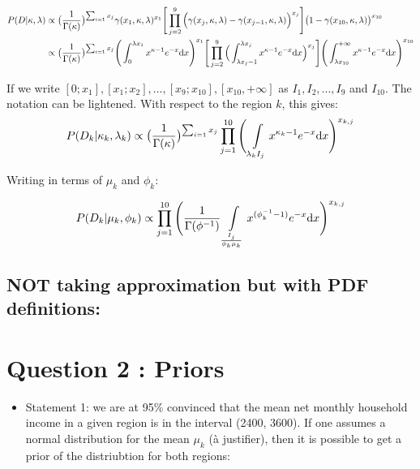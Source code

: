 \documentclass[a4paper, 12pt]{article}
\providecommand{\tightlist}{\setlength{\itemsep}{0pt}\setlength{\parskip}{0pt}}
\begin{document}
    \[
    \begin{split}
    P(D| \kappa, \lambda) & \propto \big(\frac{1}{\Gamma(\kappa)}\big)^{\sum_{i=1} x_j} \gamma(x_1 , \kappa, \lambda)^{x_1} \Bigg[ \prod_{j=2}^9  \Big( \gamma(x_{j} , \kappa, \lambda)- \gamma(x_{j-1} , \kappa, \lambda)\Big)^{x_j}\Bigg] \big(1-\gamma(x_{10} , \kappa, \lambda)\big)^{x_{10}}  \\
    & \propto \big(\frac{1}{\Gamma(\kappa)}\big)^{\sum_{i=1} x_j}  \Bigg( \int_0^{\lambda x_1}  x^{\kappa-1} e^{-x} \mathrm{d} x \Bigg)^{x_1}  \Bigg[ \prod_{j=2}^9 \Big( \int_{\lambda  x_j-1}^{\lambda x_{j}}  x^{\kappa-1} e^{-x} \mathrm{d} x \Big)^{x_{j}}\Bigg] \Bigg( \int_{\lambda x_{10}}^{+\infty}  x^{\kappa-1} e^{-x} \mathrm{d} x \Bigg)^{x_{10}}
    \end{split} 
    \]

    If we write
    \([0; x_1], [x_1; x_2], ..., [x_9; x_{10}], [x_{10}, +\infty]\) as
    \(I_1, I_2, ..., I_9\) and \(I_{10}\). The notation can be
    lightened. With respect to the region \(k\), this gives: \[
    P(D_k | \kappa_k, \lambda_k) \propto \big(\frac{1}{\Gamma(\kappa)}\big)^{\sum_{i=1} x_j}  \prod_{j=1}^{10} \Bigg( \int\limits_{\lambda_k I_j} x^{\kappa_k-1} e^{-x} \mathrm{d} x \Bigg)^{x_{k,j}}
    \]

    Writing in terms of \(\mu_k\) and \(\phi_k\):

    \[
    P(D_k | \mu_k, \phi_k) \propto  \prod_{j=1}^{10} \Bigg( \frac{1}{\Gamma(\phi^{-1})} \int\limits_{ \frac{I_j}{\phi_k \mu_k}} x^{(\phi_k^{-1}-1)} e^{-x} \mathrm{d} x \Bigg)^{x_{k,j}}
    \]

    \hypertarget{not-taking-approximation-but-with-pdf-definitions}{%
    \subsection{NOT taking approximation but with PDF
    definitions:}\label{not-taking-approximation-but-with-pdf-definitions}}

    \hypertarget{question-2-priors}{%
    \section{Question 2 : Priors}\label{question-2-priors}}

    \begin{itemize}
    \tightlist
    \item
      Statement 1: we are at 95\% convinced that the mean net monthly
      household income in a given region is in the interval (2400,
      3600). If one assumes a normal distribution for the mean \(\mu_k\)
      (à justifier), then it is possible to get a prior of the
      distriubtion for both regions:
    \end{itemize}
\end{document}
